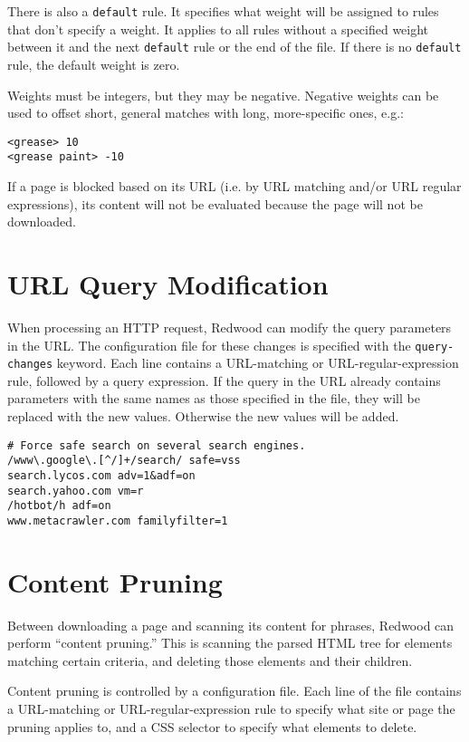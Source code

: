 \documentclass{article}
\begin{document}
There is also a \verb"default" rule. It specifies what weight will be assigned to rules that don't specify a weight. 
It applies to all rules without a specified weight between it and the next \verb"default" rule or the end of the file. 
If there is no \verb"default" rule, the default weight is zero.

Weights must be integers, but they may be negative. Negative weights can be used to offset short, general matches 
with long, more-specific ones, e.g.:

\begin{verbatim}
<grease> 10
<grease paint> -10
\end{verbatim}

If a page is blocked based on its URL (i.e. by URL matching and/or URL regular expressions), 
its content will not be evaluated because the page will not be downloaded.

\section{URL Query Modification}

When processing an HTTP request, Redwood can modify the query parameters in the URL.
The configuration file for these changes is specified with the \verb"query-changes" keyword.
Each line contains a URL-matching or URL-regular-expression rule, 
followed by a query expression.
If the query in the URL already contains parameters with the same names as those specified in the file,
they will be replaced with the new values. Otherwise the new values will be added.

\begin{verbatim}
# Force safe search on several search engines.
/www\.google\.[^/]+/search/ safe=vss
search.lycos.com adv=1&adf=on
search.yahoo.com vm=r
/hotbot/h adf=on
www.metacrawler.com familyfilter=1
\end{verbatim}

\section{Content Pruning}

Between downloading a page and scanning its content for phrases, 
Redwood can perform ``content pruning.'' 
This is scanning the parsed HTML tree for elements matching certain criteria,
and deleting those elements and their children.

Content pruning is controlled by a configuration file.
Each line of the file contains a URL-matching or URL-regular-expression rule
to specify what site or page the pruning applies to, 
and a CSS selector to specify what elements to delete.
\end{document}
